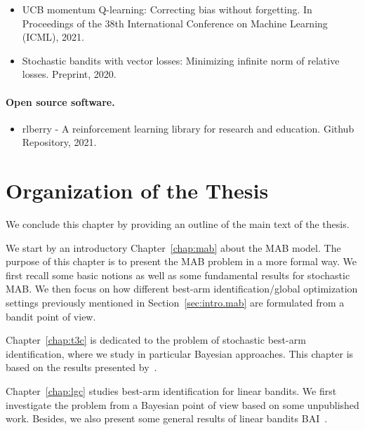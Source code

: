 \begin{itemize}[label=]
    \item UCB momentum Q-learning: Correcting bias without forgetting. In Proceedings of the 38th International Conference on Machine Learning (ICML), 2021.~\citep{menard2021ucbmq}
    \item Stochastic bandits with vector losses: Minimizing infinite norm of relative losses. Preprint, 2020.~\citep{shang2020vector}
\end{itemize}

\paragraph{Open source software.}

\begin{itemize}[label=]
    \item rlberry - A reinforcement learning library for research and education. Github Repository, 2021.~\citep{rlberry2021}
\end{itemize}

\section{Organization of the Thesis}\label{sec:intro.organization}

We conclude this chapter by providing an outline of the main text of the thesis. 

We start by an introductory Chapter~\ref{chap:mab} about the MAB model. The purpose of this chapter is to present the MAB problem in a more formal way. We first recall some basic notions as well as some fundamental results for stochastic MAB. We then focus on how different best-arm identification/global optimization settings previously mentioned in Section~\ref{sec:intro.mab} are formulated from a bandit point of view.

Chapter~\ref{chap:t3c} is dedicated to the problem of stochastic best-arm identification, where we study in particular Bayesian approaches. This chapter is based on the results presented by~\cite{shang2020t3c}.

Chapter~\ref{chap:lgc} studies best-arm identification for linear bandits. We first investigate the problem from a Bayesian point of view based on some unpublished work. Besides, we also present some general results of linear bandits BAI~\citep{degenne2020game}. 

